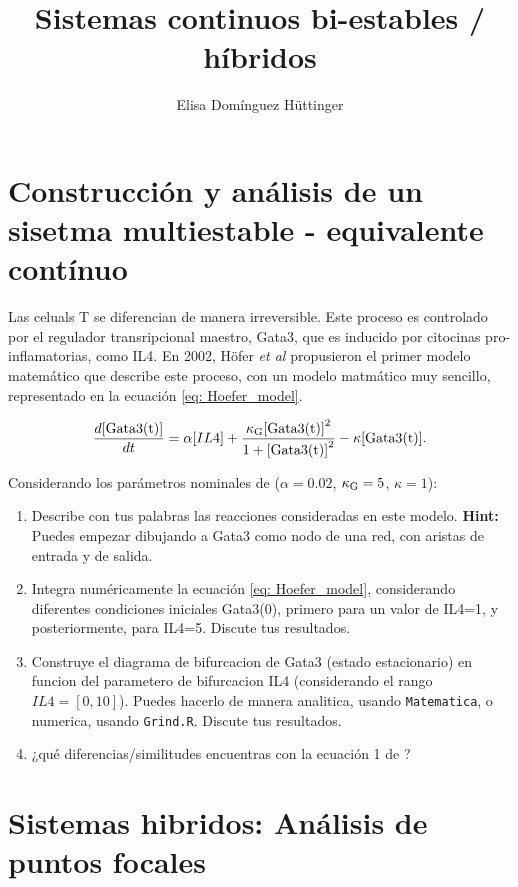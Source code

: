 \documentclass[10pt,letterpaper]{article}
\title{ 
\textbf{Sistemas continuos bi-estables / híbridos}}
\author{Elisa Dom\'{i}nguez H\"{u}ttinger}
\begin{document}
 \maketitle




\section{Construcción y análisis de un sisetma multiestable - equivalente contínuo}


Las celuals T se diferencian de manera irreversible. Este proceso es controlado por el regulador transripcional maestro, Gata3, que es inducido por 
citocinas pro-inflamatorias, como IL4. 
En 2002, H\"{o}fer \textit{et al} \cite{Hofer2002} propusieron el primer modelo matemático que describe este proceso, con un modelo matmático muy  sencillo, representado en la ecuación \ref{eq: Hoefer_model}.


\begin{equation}
\frac{d{{\rm [Gata3(t)]}}}{dt}=\alpha{[IL4]} + \frac { \kappa_{\rm G} {\rm[Gata3(t)]}^{2}} {1+{\rm [Gata3(t)]}^{2}}-\kappa {\rm[Gata3(t)]}.
\label{eq: Hoefer_model}
\end{equation}

Considerando los parámetros nominales de \cite{Hofer2002} ($\alpha=0.02$, $\kappa_{\rm G} =5$, $\kappa = 1$):

\begin{enumerate}
\item Describe con tus palabras las reacciones consideradas en este modelo. \textbf{Hint:} Puedes empezar dibujando a Gata3 como nodo de una red, con aristas de entrada y de salida.
\item Integra numéricamente la ecuación \ref{eq: Hoefer_model}, considerando diferentes condiciones iniciales Gata3(0), primero para un valor de IL4=1, y posteriormente, para IL4=5. Discute tus resultados.
\item Construye el diagrama de bifurcacion de Gata3 (estado estacionario) en funcion del parametero de bifurcacion IL4 (considerando el rango ${IL4}= [0, 10]$). Puedes hacerlo de manera analitica, usando \verb|Matematica|, o numerica, usando \verb|Grind.R|. Discute tus resultados.
\item ¿qué diferencias/similitudes encuentras con la ecuación 1 de \cite{Scheffer2001}?
\end{enumerate}


\section{Sistemas hibridos: Análisis de puntos focales} 
\end{document}
